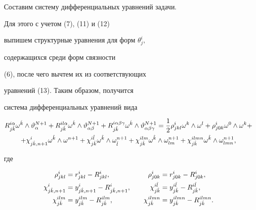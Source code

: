 Составим систему дифференциальных уравнений задачи. 


Для этого с учетом (7), (11) и (12)


выпишем структурные уравнения для форм $\theta^i_j,$


содержащихся среди форм связности


(6), после чего вычтем их из соответствующих 


уравнений (13). Таким образом, получится


система дифференциальных уравнений вида


\begin{multline}


R^{i\alpha}_{j\Hat{k}}\omega^{\Hat{k}}\wedge\vartheta^{N+1}_\alpha+


R^{il\alpha}_{j\Hat{k}}\omega^{\Hat{k}}\wedge\vartheta^{N+1}_{\alpha\beta}+


R^{i\alpha\beta\gamma}_{j\Hat{k}}\omega^{\Hat{k}}\wedge


\vartheta^{N+1}_{\alpha\beta\gamma}=\frac{1}{2}\rho^i_{jkl}


\omega^k\wedge\omega^l+\rho^i_{j0k}\omega^0\wedge\omega^k+ \\


%


+\chi^i_{j\Hat{k},n+1}\omega^{\Hat{k}}\wedge\omega^{n+1}+


\chi^{i\Hat{l}}_{j\Hat{k}}\omega^{\Hat{k}}\wedge\omega^{n+1}_{\Hat{l}}+


\chi^{ilm}_{j\Hat{k}}\omega^{\Hat{k}}\wedge\omega^{n+1}_{lm}+


\chi^{ilmn}_{j\Hat{k}}\omega^{\Hat{k}}\wedge\omega^{n+1}_{lmn},


\end{multline}


где


\begin{alignat*}{2}


\rho^i_{jkl}&=r^i_{jkl}-R^i_{jkl}, &\quad\rho^i_{j0k}&=r^i_{j0k}-R^i_{j0k},\\


%


\chi^i_{j\Hat{k},n+1}&=y^i_{j\Hat{k},n+1}-R^i_{j\Hat{k},n+1}, & \quad


\chi^{i\Hat{l}}_{j\Hat{k}}&=y^{i\Hat{l}}_{j\Hat{k}}-R^{i\Hat{l}}_{j\Hat{k}}, \\


%


\chi^{ilm}_{j\Hat{k}}&=y^{ilm}_{j\Hat{k}}-R^{ilm}_{j\Hat{k}}, &\quad


\chi^{ilmn}_{j\Hat{k}}&=y^{ilmn}_{j\Hat{k}}-R^{ilmn}_{j\Hat{k}}.


\end{alignat*}





